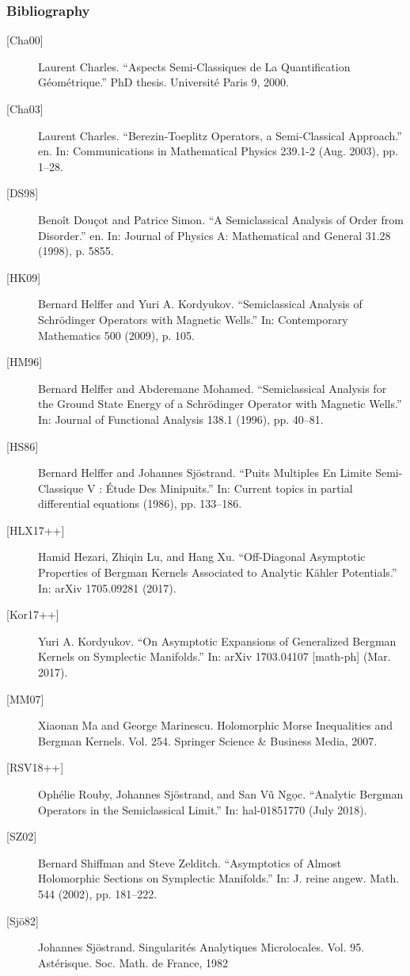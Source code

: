 \documentclass[mathserif]{beamer}
\begin{document}
  \begin{frame}[allowframebreaks]
    \frametitle{Bibliography}
        {\footnotesize
        \begin{description}
        \item[{[Cha00]}] Laurent Charles. “Aspects Semi-Classiques de La Quantification Géométrique.” PhD thesis. Université Paris 9, 2000.
        \item[{[Cha03]}] Laurent Charles. “Berezin-Toeplitz Operators, a Semi-Classical Approach.” en. In: Communications in Mathematical Physics 239.1-2
(Aug. 2003), pp. 1–28.
        \item[{[DS98]}] Benoît Douçot and Patrice Simon. “A Semiclassical Analysis of Order
from Disorder.” en. In: Journal of Physics A: Mathematical and General
31.28 (1998), p. 5855.
\item[{[HK09]}] Bernard Helffer and Yuri A. Kordyukov. “Semiclassical Analysis of
Schrödinger Operators with Magnetic Wells.” In: Contemporary Mathematics 500 (2009), p. 105.
\item[{[HM96]}] Bernard Helffer and Abderemane Mohamed. “Semiclassical Analysis for
the Ground State Energy of a Schrödinger Operator with Magnetic
Wells.” In: Journal of Functional Analysis 138.1 (1996), pp. 40–81.
\item[{[HS86]}] Bernard Helffer and Johannes Sjöstrand. “Puits Multiples En Limite
Semi-Classique V : Étude Des Minipuits.” In: Current topics in partial
differential equations (1986), pp. 133–186.
\item[{[HLX17++]}] Hamid Hezari, Zhiqin Lu, and Hang Xu. “Off-Diagonal Asymptotic
Properties of Bergman Kernels Associated to Analytic Kähler Potentials.” In: arXiv 1705.09281 (2017).
\item[{[Kor17++]}] Yuri A. Kordyukov. “On Asymptotic Expansions of Generalized Bergman
Kernels on Symplectic Manifolds.” In: arXiv 1703.04107 [math-ph]
(Mar. 2017).
\item[{[MM07]}] Xiaonan Ma and George Marinescu. Holomorphic Morse Inequalities
and Bergman Kernels. Vol. 254. Springer Science \& Business Media,
2007.
\item[{[RSV18++]}] Ophélie Rouby, Johannes Sjöstrand, and San Vũ Ng\d{o}c. “Analytic
Bergman Operators in the Semiclassical Limit.” In: hal-01851770 (July
2018).
\item[{[SZ02]}] Bernard Shiffman and Steve Zelditch. “Asymptotics of Almost Holomorphic Sections on Symplectic Manifolds.” In: J. reine angew. Math.
544 (2002), pp. 181–222.
\item[{[Sjö82]}] Johannes Sjöstrand. Singularit\'es Analytiques Microlocales. Vol. 95.
Astérisque. Soc. Math. de France, 1982
        \end{description}
        }
      \end{frame}
\end{document}
